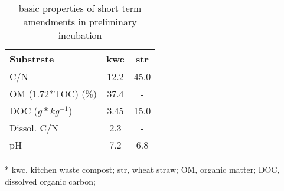 \begin{table}[H]
\centering
\caption{basic properties of short term amendments in preliminary incubation}
\label{amendments_properties_preliminary}
\begin{threeparttable}

\begin{tabular}{l    cc}
\toprule
{Substrste} &    \gls{kwc} &   \gls{str} \\
\midrule
{C/N              } &   12.2 &  45.0 \\
{OM (1.72*TOC) (\%)} &   37.4 &     - \\
{DOC ($ g*kg^{-1} $)    } &  3.45 &  15.0 \\
{Dissol. C/N      } &    2.3 &     - \\
{pH               } &    7.2 &   6.8 \\
\bottomrule
\end{tabular}

\begin{tablenotes}
	\item[*] \scriptsize \gls{kwc}, kitchen waste compost; \gls{str}, wheat straw;  OM, organic matter; DOC, dissolved organic carbon;
\end{tablenotes}

\end{threeparttable}
\end{table}
